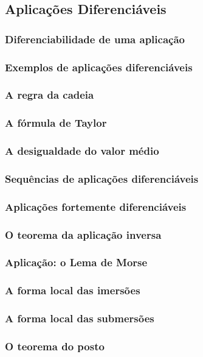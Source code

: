 \documentclass{article}
\theoremstyle{theorem}
\theoremstyle{lemma}
\theoremstyle{definition}
\theoremstyle{remark}
\begin{document}
\subsection{ Aplicações Diferenciáveis}
   \subsubsection{Diferenciabilidade de uma aplicação}
   \subsubsection{Exemplos de aplicações diferenciáveis}
   \subsubsection{A regra da cadeia}
   \subsubsection{A fórmula de Taylor}
   \subsubsection{A desigualdade do valor médio}
   \subsubsection{Sequências de aplicações diferenciáveis}
   \subsubsection{Aplicações fortemente diferenciáveis}
   \subsubsection{O teorema da aplicação inversa}
   \subsubsection{Aplicação: o Lema de Morse}
   \subsubsection{ A forma local das imersões}
   \subsubsection{ A forma local das submersões}
   \subsubsection{ O teorema do posto}
\end{document}
